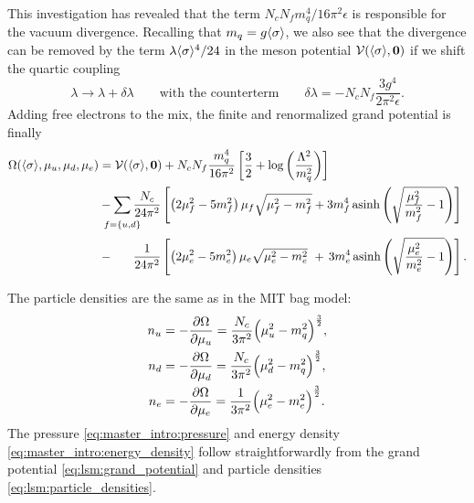 This investigation has revealed that the term $N_c N_f m_q^4 / 16 \pi^2 \epsilon$ is responsible for the vacuum divergence.
Recalling that $m_q=g \langle \sigma \rangle$,
we also see that the divergence can be removed by the term $\lambda \langle \sigma \rangle^4 / 24$ in the meson potential $\mathcal{V}(\langle \sigma \rangle,{\bm{0}})$
if we shift the quartic coupling
\begin{equation}
	\lambda \rightarrow \lambda + \delta\lambda
	\qquad \text{with the counterterm} \qquad
	\delta\lambda = -N_c N_f \frac{3 g^4}{2 \pi^2 \epsilon} .
\end{equation}
Adding free electrons to the mix, the finite and renormalized grand potential is finally
\begin{equation}
\begin{split}
	\Omega(\avg{\sigma},\mu_u,\mu_d,\mu_e) &= \pot(\avg{\sigma},\vec{0}) + N_c N_f \frac{m_q^4}{16 \pi^2} \left[ \frac{3}{2} + \log\left(\frac{{\Lambda}^2}{m_q^2}\right) \right] \\
	                                       &-\smashoperator{\sum_{\vphantom{\big|} f=\{u,d\}}} \frac{N_c}{24 \pi^2} \left[ \left( 2 \mu_f^2 - 5 m_f^2 \right) \mu_f \sqrt{\mu_f^2 - m_f^2} + 3 m_f^4 \asinh \left( \sqrt{\frac{\mu_{\smash{f}}^2}{m_f^2}-1} \right) \right] \\
	                                       &-\phantom{\sum} \, \frac{1}{24 \pi^2} \left[ \left( 2 \mu_e^2 - 5 m_e^2 \right) \mu_e \sqrt{\mu_e^2 - m_e^2} \, \, + \, 3 m_e^4 \asinh \left( \sqrt{\frac{\mu_{\smash{e}}^2}{m_e^2}-1} \right) \right].
\end{split}
\label{eq:lsm:grand_potential}
\end{equation}

The particle densities are the same as in the MIT bag model:
\begin{subequations}
\begin{align}
	n_u &= -\pdv{\Omega}{\mu_u} = \frac{N_c}{3 \pi^2} \Big( \mu_u^2 - m_q^2 \Big)^{\frac32}, \\
	n_d &= -\pdv{\Omega}{\mu_d} = \frac{N_c}{3 \pi^2} \Big( \mu_d^2 - m_q^2 \Big)^{\frac32}, \\
	n_e &= -\pdv{\Omega}{\mu_e} = \frac{  1}{3 \pi^2} \Big( \mu_e^2 - m_e^2 \Big)^{\frac32}.
\end{align}%
\label{eq:lsm:particle_densities}%
\end{subequations}%
The pressure \eqref{eq:master_intro:pressure} and energy density \eqref{eq:master_intro:energy_density} follow straightforwardly from the grand potential \eqref{eq:lsm:grand_potential} and particle densities \eqref{eq:lsm:particle_densities}.

